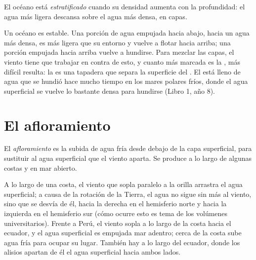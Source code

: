 \begin{definition}[Estratificación]\label{def:g10:layered-ocean:stratification}
El océano está \emph{estratificado}
cuando su densidad aumenta con la profundidad: el agua más ligera descansa
sobre el agua más densa, en capas.
\end{definition}

Un océano  es estable. Una porción de agua empujada hacia abajo,
hacia un agua más densa, es más ligera que su entorno y vuelve a flotar hacia
arriba; una porción empujada hacia arriba vuelve a hundirse. Para mezclar las
capas, el viento tiene que trabajar en contra de esto, y cuanto más marcada
es la , más difícil resulta: la  es una tapadera que
separa la superficie del . El  está lleno de
agua que se hundió hace mucho tiempo en los mares polares fríos, donde el agua
superficial se vuelve lo bastante densa para hundirse (Libro 1, año 8).

\section{El afloramiento}

\begin{definition}[Afloramiento]\label{def:g10:layered-ocean:upwelling}
El \emph{afloramiento} es la subida de agua fría desde
debajo de la capa superficial, para sustituir al agua superficial que el
viento aparta. Se produce a lo largo de algunas costas y en mar abierto.
\end{definition}

A lo largo de una costa, el viento que sopla paralelo a la orilla arrastra el
agua superficial; a causa de la rotación de la Tierra, el agua no sigue sin
más al viento, sino que se desvía de él, hacia la derecha en el hemisferio
norte y hacia la izquierda en el hemisferio sur (cómo ocurre esto es tema de
los volúmenes universitarios). Frente a Perú, el viento sopla a lo largo de la
costa hacia el ecuador, y el agua superficial es empujada mar adentro; cerca
de la costa sube agua fría para ocupar su lugar. También hay  a
lo largo del ecuador, donde los alisios apartan de él el agua superficial
hacia ambos lados.

